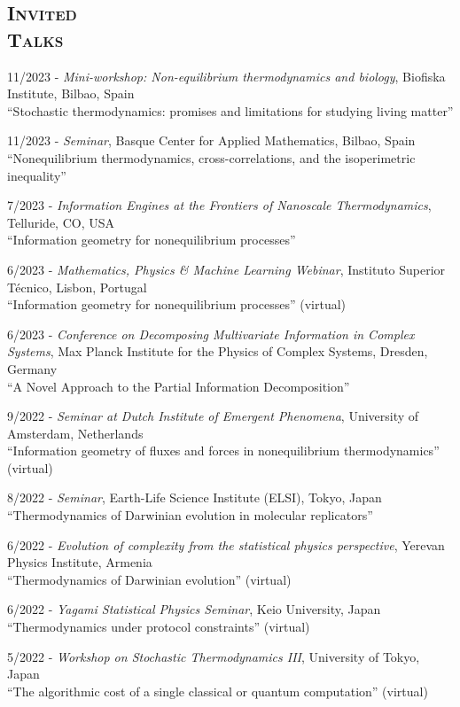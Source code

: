 \documentclass[margin,line,centered]{res}
\begin{document}
\begin{resume}
\section{\textsc{Invited\\Talks}}

11/2023 - \emph{Mini-workshop: Non-equilibrium thermodynamics and biology}, Biofiska Institute, Bilbao, Spain\\
``Stochastic thermodynamics: promises and limitations for studying living matter''

11/2023 - \emph{Seminar}, Basque Center for Applied Mathematics, Bilbao, Spain\\
``Nonequilibrium thermodynamics, cross-correlations, and the isoperimetric inequality''

7/2023 - \emph{Information Engines at the Frontiers of Nanoscale Thermodynamics}, Telluride, CO, USA\\
``Information geometry for nonequilibrium processes''

6/2023 - \emph{Mathematics, Physics \& Machine Learning Webinar}, Instituto Superior Técnico, Lisbon, Portugal\\
``Information geometry for nonequilibrium processes'' (virtual)

6/2023 - \emph{Conference on Decomposing Multivariate Information in Complex Systems}, Max Planck Institute for the Physics of Complex Systems, Dresden, Germany\\
``A Novel Approach to the Partial Information Decomposition''

9/2022 - \emph{Seminar at Dutch Institute of Emergent Phenomena}, University of Amsterdam, Netherlands\\
``Information geometry of fluxes and forces in nonequilibrium thermodynamics'' (virtual)

8/2022 - \emph{Seminar}, Earth-Life Science Institute (ELSI), Tokyo, Japan\\
``Thermodynamics of Darwinian evolution in molecular replicators''

6/2022 - \emph{Evolution of complexity from the statistical physics perspective}, Yerevan Physics Institute, Armenia\\
``Thermodynamics of Darwinian evolution'' (virtual)

6/2022 - \emph{Yagami Statistical Physics Seminar}, Keio University, Japan\\
``Thermodynamics under protocol constraints'' (virtual)

5/2022 - \emph{Workshop on Stochastic Thermodynamics III}, University of Tokyo, Japan\\
``The algorithmic cost of a single classical or quantum computation'' (virtual) %


\end{resume}
\end{document}
